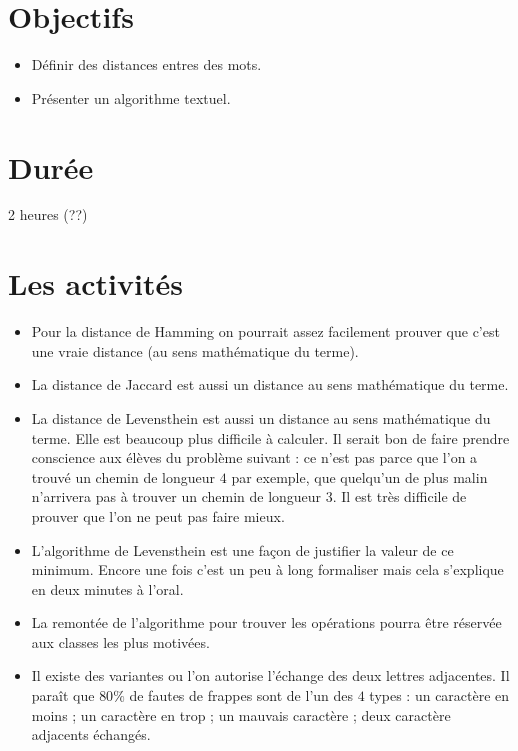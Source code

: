\documentclass[class=report,crop=false, 12pt]{standalone}
\begin{document}



\section*{Objectifs}

\begin{itemize}
  \item Définir des distances entres des mots.
  \item Présenter un algorithme textuel.
\end{itemize}


\section*{Durée}

2 heures (??)

\section*{Les activités}

\begin{itemize}
  \item Pour la distance de Hamming on pourrait assez facilement prouver que c'est une vraie distance (au sens mathématique du terme).
  
  \item La distance de Jaccard est aussi un distance au sens mathématique du terme.
  
  \item La distance de Levensthein est aussi un distance au sens mathématique du terme. Elle est beaucoup plus difficile à calculer. Il serait bon de faire prendre conscience aux élèves du problème suivant : ce n'est pas parce que l'on a trouvé un chemin de longueur $4$ par exemple, que quelqu'un de plus malin n'arrivera pas à trouver un chemin de longueur $3$. Il est très difficile de prouver que l'on ne peut pas faire mieux.
  
  \item L'algorithme de Levensthein est une façon de justifier la valeur de ce minimum. Encore une fois c'est un peu à long formaliser mais cela s'explique en deux minutes à l'oral.
  
  \item La remontée de l'algorithme pour trouver les opérations pourra être réservée aux classes les plus motivées.
  
  
  \item Il existe des variantes ou l'on autorise l'échange des deux lettres adjacentes. Il paraît que $80\%$ de fautes de frappes sont de l'un des $4$ types : un caractère en moins ; un caractère en trop ; un mauvais caractère ; deux caractère adjacents échangés.
  
    
\end{itemize}
\end{document}
